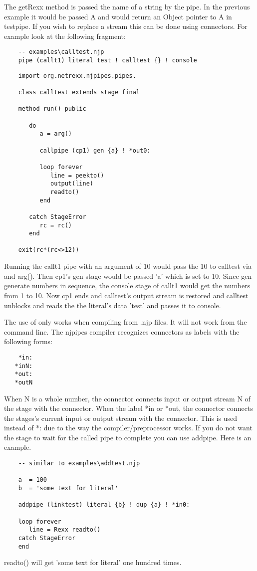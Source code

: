  The getRexx method is passed the name of a string by the pipe.  In the previous example it would be passed A and would return an Object pointer to A in testpipe. If you wish to replace a stream this can be done using connectors.  For example look at the following fragment:
\begin{verbatim}
    -- examples\calltest.njp
    pipe (callt1) literal test ! calltest {} ! console
\end{verbatim}
\begin{lstlisting}
    import org.netrexx.njpipes.pipes.

    class calltest extends stage final

    method run() public

       do
          a = arg()

          callpipe (cp1) gen {a} ! *out0:

          loop forever
             line = peekto()
             output(line)
             readto()
          end

       catch StageError
          rc = rc()
       end

    exit(rc*(rc<>12))
\end{lstlisting}
Running the callt1 pipe with an argument of 10 would pass the 10 to calltest via {} and arg().  Then cp1's gen stage would be passed 'a' which is set to 10.  Since gen generate numbers in sequence, the console stage of callt1 would get the numbers from 1 to 10.  Now cp1 ends and calltest's output stream is restored and calltest unblocks and reads the the literal's data 'test' and passes it to console.

The use of {} only works when compiling from .njp files.  It will not work from the command line.
The njpipes compiler recognizes connectors as labels with the following forms:
\begin{verbatim}
    *in:
   *inN:
   *out:
   *outN
\end{verbatim}

When N is a whole number, the connector connects input or output stream N of the stage with the connector.
When the label *in or *out, the connector connects the stages's current input or output stream with the connector.  This is used instead of *: due to the way the compiler/preprocessor works.
If you do not want the stage to wait for the called pipe to complete you can use addpipe.  Here is an example.
\begin{lstlisting}
    -- similar to examples\addtest.njp

    a  = 100
    b  = 'some text for literal'

    addpipe (linktest) literal {b} ! dup {a} ! *in0:

    loop forever
       line = Rexx readto()
    catch StageError
    end
\end{lstlisting}
    readto() will get 'some text for literal' one hundred times.

